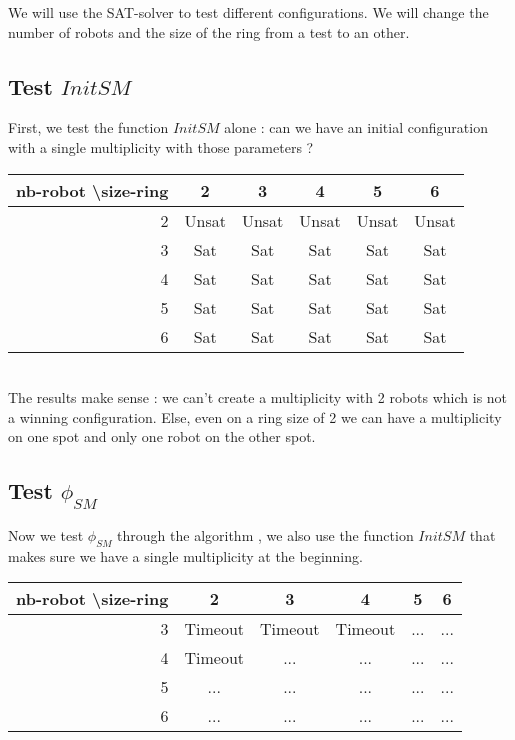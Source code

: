 \documentclass{article}
\begin{document}
We will use the SAT-solver to test different configurations. We will change the number of robots and the size of the ring from a test to an other.

\subsection{Test $InitSM$}

First, we test the function $InitSM$ alone : can we have an initial configuration with a single multiplicity with those parameters ?\\

\begin{tabular}{|r|c|c|c|c|c|}
  \hline
  nb-robot \textbackslash size-ring & 2 & 3 & 4 & 5 & 6\\
  \hline
  2 & Unsat & Unsat & Unsat & Unsat & Unsat \\
  \hline
  3 & Sat & Sat & Sat & Sat & Sat \\
  \hline
  4 & Sat & Sat & Sat & Sat & Sat \\
  \hline
  5 & Sat & Sat & Sat & Sat & Sat \\
  \hline
  6 & Sat & Sat & Sat & Sat & Sat \\
  \hline
\end{tabular}
\\

The results make sense : we can't create a multiplicity with 2 robots which is not a winning configuration. Else, even on a ring size of 2 we can have a multiplicity on one spot and only one robot on the other spot.

\subsection{Test $\phi_{SM}$}

Now we test $\phi_{SM}$ through the algorithm \cite{algo}, we also use the function $InitSM$ that makes sure we have a single multiplicity at the beginning.\\

\begin{tabular}{|r|c|c|c|c|c|}
  \hline
  nb-robot \textbackslash size-ring & 2 & 3 & 4 & 5 & 6\\
  \hline
  3 & Timeout & Timeout & Timeout & ... & ... \\
  \hline
  4 & Timeout & ... & ... & ... & ... \\
  \hline
  5 & ... & ... & ... & ... & ... \\
  \hline
  6 & ... & ... & ... & ... & ... \\
  \hline
\end{tabular}
\\
\end{document}
